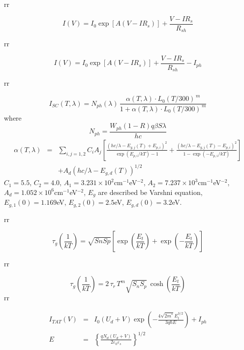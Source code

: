 \documentclass[14pt]{article}
\numberwithin{equation}{part}
\begin{document}
rr

\begin{equation*}
    I(V)=I_0\exp \left[A(V-IR_s)\right]+\frac{V-IR_s}{R_{sh}}
\end{equation*}

rr

\begin{equation*}
    I(V)=I_0\exp \left[A(V-IR_s)\right]+\frac{V-IR_s}{R_{sh}}-I_{ph}
\end{equation*}


rr

\begin{equation*}
    I_{SC}(T,\lambda)=N_{ph}(\lambda)\,\frac{\alpha(T,\lambda)\cdot L_0(T/300)^{\,m}}{1+\alpha(T,\lambda)\cdot L_0(T/300)^{\,m}}
\end{equation*}
where
\begin{equation*}
    N_{ph}=\frac{W_{ph}(1-R)q\beta S \lambda}{h c}
\end{equation*}
\begin{eqnarray*}
    \alpha(T,\lambda)&=&\sum_{i,j=1,2}C_iA_j\left[\frac{(hc/\lambda-E_{g,j}(T)+E_{p,i})^2}{\exp(E_{p,i}/kT)-1}+
       \frac{(hc/\lambda-E_{g,j}(T)-E_{p,i})^2}{1-\exp(-E_{p,i}/kT)}\right]\\
       &&+A_d(hc/\lambda-E_{g,d}(T))^{1/2}
\end{eqnarray*}
  $C_1=5.5$,
  $C_2=4.0$,
  $A_1=3.231\times10^2$cm$^{-1}$eV$^{-2}$,
  $A_2=7.237\times10^3$cm$^{-1}$eV$^{-2}$,
  $A_d=1.052\times10^6$cm$^{-1}$eV$^{-2}$,
  $E_g$ are described be Varshni equation,
  $E_{g,1}(0)=1.169$eV,
  $E_{g,2}(0)=2.5$eV,
  $E_{g,d}(0)=3.2$eV.



rr

\begin{equation*}
    \tau_{g}\left(\frac{1}{kT}\right)=\sqrt{SnSp}\left[\exp\left(\frac{E_t}{kT}\right)+\exp\left(-\frac{E_t}{kT}\right)\right]
\end{equation*}

rr

\begin{equation*}
    \tau_{g}\left(\frac{1}{kT}\right)=2\,\tau_{r}\,T^m\sqrt{S_nS_p}\,\cosh\left(\frac{E_t}{kT}\right)
\end{equation*}
rr

\begin{eqnarray*}
    I_{TAT}(V)&=&I_0(U_d+V)\exp\left(-\frac{4\sqrt{2m^*}E_t^{3/2}}{3q\hbar E}\right)+I_{ph}\\
    E&=&\left\{\frac{qN_d(U_d+V)}{2\varepsilon_0\varepsilon_s}\right\}^{1/2}
\end{eqnarray*}
\end{document}
